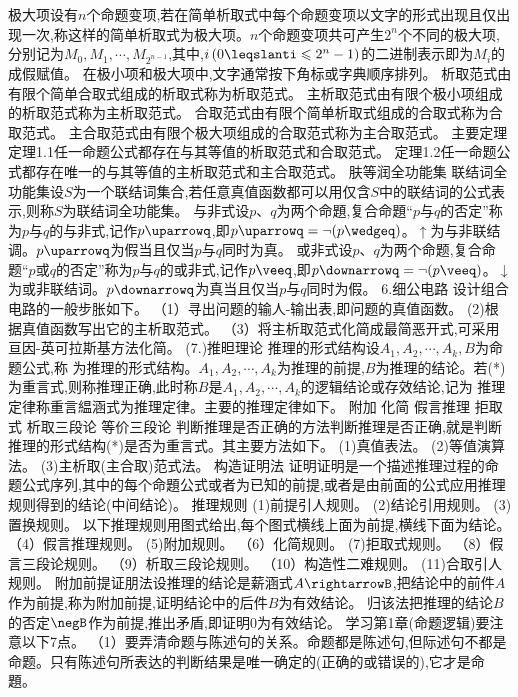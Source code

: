 极大项设有$n$个命题变项,若在简单析取式中每个命题变项以文字的形式出现且仅出现一次,称这样的简单析取式为极大项。$n$个命题变项共可产生$2^{n}$个不同的极大项,分别记为$M_{0},M_{1},\cdots,M_{2^{n-1}}$,其中,$i\left(0\leqslanti\leqslant2^{n}-1\right)$的二进制表示即为$M_{i}$的成假赋值。
在极小项和极大项中,文字通常按下角标或字典顺序排列。
析取范式由有限个简单合取式组成的析取式称为析取范式。
主析取范式由有限个极小项组成的析取范式称为主析取范式。
合取范式由有限个简单析取式组成的合取式称为合取范式。
主合取范式由有限个极大项组成的合取范式称为主合取范式。
{主要定理}
定理1.1任一命题公式都存在与其等值的析取范式和合取范式。
定理1.2任一命题公式都存在唯一的与其等值的主析取范式和主合取范式。
肤等润全功能集
联结词全功能集设$S$为一个联结词集合,若任意真值函数都可以用仅含$S$中的联结词的公式表示,则称$S$为联结词全功能集。
与非式设$p、q$为两个命題,复合命題“$p$与$q$的否定”称为$p$与$q$的与非式,记作$p\uparrowq$,即$p\uparrowq=\neg(p\wedgeq)$。$\uparrow$为与非联结调。$p\uparrowq$为假当且仅当$p$与$q$同时为真。
或非式设$p、q$为两个命题,复合命题“$p$或$q$的否定”称为$p$与$q$的或非式,记作$p\veeq$,即$p\downarrowq=\neg(p\veeq)$。$\downarrow$为或非联结词。$p\downarrowq$为真当且仅当$p$与$q$同时为假。
{6.细公电路}
设计组合电路的一般步胀如下。
（1）寻出问题的输人-输出表,即问题的真值函数。
(2)根据真值函数写出它的主析取范式。
（3）将主析取范式化简成最简恶开式,可采用亘因-英可拉斯基方法化简。
(7.)推㫜理论
推理的形式结构设$A_{1},A_{2},\cdots,A_{k},B$为命题公式,称
为推理的形式结构。$A_{1},A_{2},\cdots,A_{k}$为推理的前提,$B$为推理的结论。若(*)为重言式,则称推理正确,此时称$B$是$A_{1},A_{2},\cdots,A_{k}$的逻辑结论或存效结论,记为
推理定律称重言緼涵式为推理定律。主要的推理定律如下。
附加
化简
假言推理
拒取式
析取三段论
等价三段论
判断推理是否正确的方法判断推理是否正确,就是判断推理的形式结构(*)是否为重言式。其主要方法如下。
(1)真值表法。
(2)等值演算法。
(3)主析取(主合取)范式法。
构造证明法
证明证明是一个描述推理过程的命题公式序列,其中的每个命題公式或者为已知的前提,或者是由前面的公式应用推理规则得到的结论(中间结论)。
推理规则
(1)前提引人规则。
(2)结论引用规则。
(3)置换规则。
以下推理规则用图式给出,每个图式横线上面为前提,横线下面为结论。
（4）假言推理规则。
(5)附加规则。
（6）化简规则。
(7)拒取式规则。
（8）假言三段论规则。
（9）析取三段论规则。
（10）构造性二难规则。
(11)合取引人规则。
附加前提证朋法设推理的结论是薪涵式$A\rightarrowB$,把结论中的前件$A$作为前提,称为附加前提,证明结论中的后件$B$为有效结论。
归该法把推理的结论$B$的否定$\negB$作为前提,推出矛盾,即证明0为有效结论。
学习第1章(命题逻辑)要注意以下7点。
（1）要弄清命题与陈述句的关系。命题都是陈述句,但际述句不都是命题。只有陈述句所表达的判断结果是唯一确定的(正确的或错误的),它才是命題。
